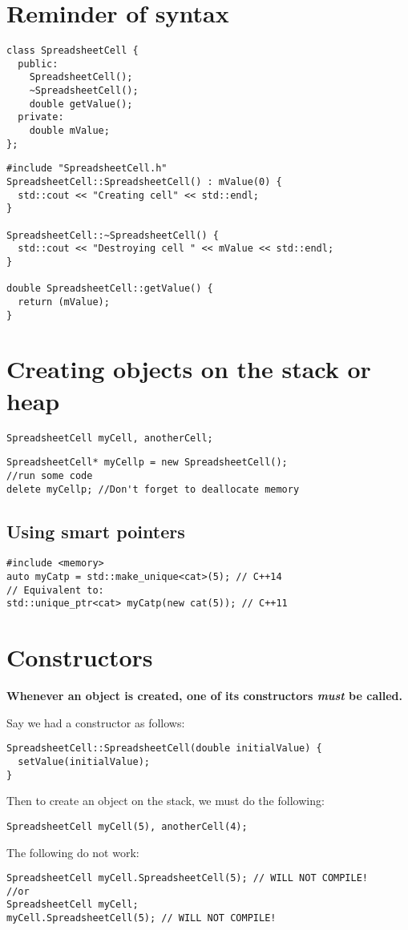 \documentclass[a4paper,12pt,oneside]{book}
\begin{document}
\section{Reminder of syntax}
\begin{lstlisting}[caption={SpreadsheetCell.h}]
class SpreadsheetCell {
  public:
    SpreadsheetCell();
    ~SpreadsheetCell();
    double getValue();
  private:
    double mValue;
};
\end{lstlisting}
\begin{lstlisting}[caption={SpreadsheetCell.cpp}]
#include "SpreadsheetCell.h"
SpreadsheetCell::SpreadsheetCell() : mValue(0) {
  std::cout << "Creating cell" << std::endl;
}

SpreadsheetCell::~SpreadsheetCell() {
  std::cout << "Destroying cell " << mValue << std::endl;
}

double SpreadsheetCell::getValue() {
  return (mValue);
}
\end{lstlisting}
\section{Creating objects on the stack or heap}
\begin{lstlisting}[caption={Creating objects on the stack}]
SpreadsheetCell myCell, anotherCell;
\end{lstlisting}
\begin{lstlisting}[caption={Creating objects on the heap}]
SpreadsheetCell* myCellp = new SpreadsheetCell();
//run some code
delete myCellp; //Don't forget to deallocate memory
\end{lstlisting}

\subsection{Using smart pointers}
\begin{lstlisting}
#include <memory>
auto myCatp = std::make_unique<cat>(5); // C++14
// Equivalent to:
std::unique_ptr<cat> myCatp(new cat(5)); // C++11
\end{lstlisting}

\section{Constructors}
\textbf{Whenever an object is created, one of its constructors \emph{must} be called.}

Say we had a constructor as follows:
\begin{lstlisting}
SpreadsheetCell::SpreadsheetCell(double initialValue) {
  setValue(initialValue);
}
\end{lstlisting}
Then to create an object on the stack, we must do the following:
\begin{lstlisting}
SpreadsheetCell myCell(5), anotherCell(4);
\end{lstlisting}
The following do not work:
\begin{lstlisting}
SpreadsheetCell myCell.SpreadsheetCell(5); // WILL NOT COMPILE!
//or
SpreadsheetCell myCell;
myCell.SpreadsheetCell(5); // WILL NOT COMPILE!
\end{lstlisting}
\end{document}
